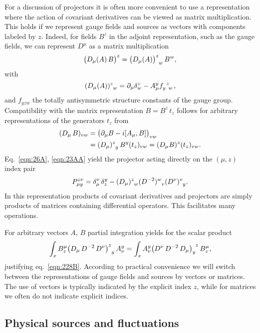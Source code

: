 \documentclass[twocolumn,aps,prd,amsmath,amssymb,preprintnumbers,longbibliography]{revtex4-1}
\numberwithin{equation}{section}
\newenvironment{alignedeqn}{\begin{equation}\begin{aligned}}{\end{aligned}\end{equation}\ignorespacesafterend}
\begin{document}
For a discussion of projectors it is often more convenient to use a representation where the action of covariant derivatives can be viewed as matrix multiplication. This holds if we represent gauge fields and sources as vectors with components labeled by $z$. Indeed, for fields $B^z$ in the adjoint representation, such as the gauge fields, we can represent $D^\mu$ as a matrix multiplication
\begin{equation}\label{eqn:26A}
	\bigl(D_\mu(A) \, B\bigr)^z
	= \tensor{\bigl(D_\mu(A)\bigr)}{^z_w} \, B^w,
\end{equation}
with
\begin{equation}\label{eqn:23AA}
	\tensor{(D_\mu(A))}{^z_w}
	= \partial_\mu \delta_w^z - A_\mu^y \tensor{f}{_y^z_w},
\end{equation}
and $f_{yzw}$ the totally antisymmetric structure constants of the gauge group. Compatibility with the matrix representation $B = B^z \, t_z$ follows for arbitrary representations of the generators $t_z$ from
\begin{alignedeqn}\label{eqn:26B}
	(D_\mu \, B)_{vw}
	&= \bigl(\partial_\mu B - i [A_\mu,B]\bigr)_{vw}\\
	&= \tensor{(D_\mu)}{^z_y} \, B^y (t_z)_{vw}
	= (D_\mu B)^z (t_z)_{vw}.
\end{alignedeqn}
Eq.~\eqref{eqn:26A}, \eqref{eqn:23AA} yield the projector acting directly on the $(\mu,z)$ index pair
\begin{equation}\label{eqn:23AB}
	P_{\mu y}^{z \nu}
	= \delta_\mu^\nu \, \delta_z^y - \tensor{(D_\mu)}{^z_w} \tensor{(D^{-2})}{^w_v}\tensor{(D^\nu)}{^v_y}.
\end{equation}
In this representation products of covariant derivatives and projectors are simply products of matrices containing differential operators. This facilitates many operations.

For arbitrary vectors $A$, $B$ partial integration yields for the scalar product
\begin{equation}
	\int_x B_z^\mu \tensor{\bigl(D_\mu \, D^{-2} \, D^\nu\bigr)}{^z_y} \, A_\nu^y
	= \int_x A_\nu^y \tensor{\bigl(D^\nu \, D^{-2} \, D_\mu\bigr)}{_y^z} \, B_z^\mu,
\end{equation}
justifying eq.~\eqref{eqn:228B}. According to practical convenience we will switch between the representations of gauge fields and sources by vectors or matrices. The use of vectors is typically indicated by the explicit index $z$, while for matrices we often do not indicate explicit indices.


\subsection{Physical sources and fluctuations}
\end{document}

